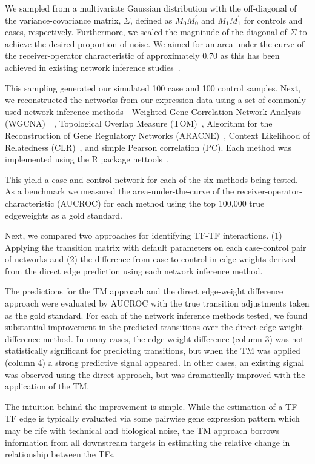 \documentclass[9pt,twocolumn,twoside]{pnas-new}
\begin{document}
We sampled from a multivariate Gaussian distribution with the off-diagonal
of the variance-covariance matrix, $\Sigma$, defined as $M_{0}M_{0}^{\prime}$ and $M_{1}M_{1}^{\prime}$ for controls and cases, respectively.
Furthermore, we scaled the magnitude of the diagonal of $\Sigma$
to achieve the desired proportion of noise. We aimed for an area under
the curve of the receiver-operator characteristic of approximately
0.70 as this has been achieved in existing network inference studies~\cite{glass2013passing}.

This sampling generated our simulated 100 case and 100 control samples. Next, we reconstructed the networks
from our expression data using a set of commonly used network inference
methods - Weighted Gene Correlation Network Analysis (WGCNA)~\cite{Langfelder2008WGCNA}~\cite{Langfelder2008FastR},
Topological Overlap Measure (TOM)~\cite{ravasz2002hierarchical},
Algorithm for the Reconstruction of Gene Regulatory Networks (ARACNE)~\cite{margolin2006aracne},
Context Likelihood of Relatedness (CLR)~\cite{faith2007large}, 
and simple Pearson correlation (PC). Each method was implemented using the R package nettools~\cite{nettools}.

This yield a case and control network for each of the six methods being tested.  As a benchmark we measured the area-under-the-curve
of the receiver-operator-characteristic (AUCROC) for each method using the top 100,000 true edgeweights as a gold standard.  

Next, we compared two approaches for identifying TF-TF interactions.  (1) Applying the transition matrix with default parameters on each case-control pair of networks and (2) the difference from
case to control in edge-weights derived from the direct edge prediction
using each network inference method. 

The predictions for the TM approach
and the direct edge-weight difference approach were evaluated by AUCROC with the true transition
adjustments taken as the gold standard. For each of the network inference
methods tested, we found substantial improvement in the predicted
transitions over the direct edge-weight difference method. In many cases,
the edge-weight difference (column 3) was not statistically significant
for predicting transitions, but when the TM was applied (column 4)
a strong predictive signal appeared. In other cases, an existing signal
was observed using the direct approach, but was dramatically improved
with the application of the TM.

The intuition behind the improvement is simple. While the estimation
of a TF-TF edge is typically evaluated via some pairwise gene expression
pattern which may be rife with technical and biological noise, the
TM approach borrows information from all downstream targets in estimating
the relative change in relationship between the TFs. 
\end{document}
